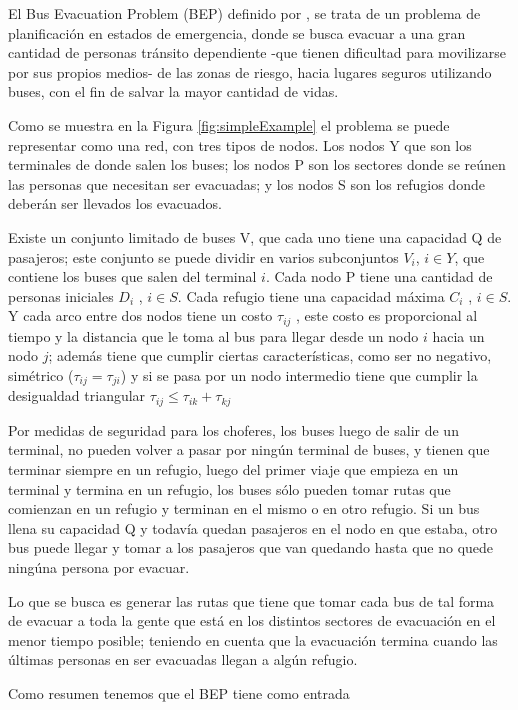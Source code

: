 \documentclass[letter, 10pt]{article}
\begin{document}
El Bus Evacuation Problem (BEP) definido por \cite{bish2011planning}, se trata de un problema de planificación en estados de emergencia, donde se busca evacuar a una gran cantidad de personas tránsito dependiente -que tienen dificultad para movilizarse por sus propios medios-  de las zonas de riesgo, hacia lugares seguros utilizando buses, con el fin de salvar la mayor cantidad de vidas.

Como se muestra en la Figura \ref{fig:simpleExample} el problema se puede representar como una red, con tres tipos de nodos. Los nodos Y que son los terminales de donde salen los buses; los nodos P son los sectores donde se reúnen las personas que necesitan ser evacuadas; y los nodos S son los refugios donde deberán ser llevados los evacuados.

Existe un conjunto limitado de buses V, que cada uno tiene una capacidad Q de pasajeros; este conjunto se puede dividir en varios subconjuntos $V_i$, $i\in Y$, que contiene los buses que salen del terminal $i$. Cada nodo P tiene una cantidad de personas iniciales $D_i$ , $i \in S$. Cada refugio tiene una capacidad máxima $C_i$ , $i \in S$. Y cada arco entre dos nodos tiene un costo $\tau_{ij}$ , este costo es proporcional al tiempo y la distancia que le toma al bus para llegar desde un nodo $i$ hacia un nodo $j$; además tiene que cumplir ciertas características, como ser no negativo, simétrico ($\tau_{ij} = \tau_{ji}$) y si se pasa por un nodo intermedio tiene que cumplir la desigualdad triangular $\tau_{ij} \leq \tau_{ik} + \tau_{kj}$

Por medidas de seguridad para los choferes, los buses luego de salir de un terminal, no pueden volver a pasar por ningún terminal de buses, y tienen que terminar siempre en un refugio, luego del primer viaje que empieza en un terminal y termina en un refugio, los buses sólo pueden tomar rutas que comienzan en un refugio y terminan en el mismo o en otro refugio. Si un bus llena su capacidad Q y todavía quedan pasajeros en el nodo en que estaba, otro bus puede llegar y tomar a los pasajeros que van quedando hasta que no quede ningúna persona por evacuar.

Lo que se busca es generar las rutas que tiene que tomar cada bus de tal forma de evacuar a toda la gente que está en los distintos sectores de evacuación en el menor tiempo posible; teniendo en cuenta que la evacuación termina cuando las últimas personas en ser evacuadas llegan a algún refugio.

Como resumen tenemos que el BEP tiene como entrada
\end{document}
